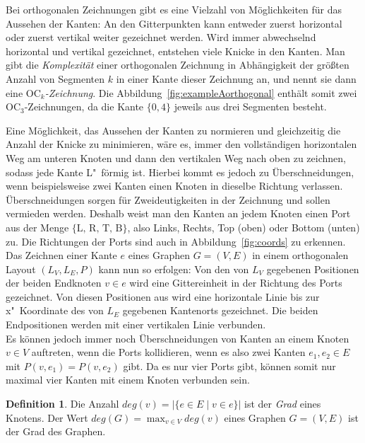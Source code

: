 \documentclass[a4paper]{scrreprt}
\theoremstyle{definition}
\newtheorem{definition}[satz]{Definition}
\begin{document}
Bei orthogonalen Zeichnungen gibt es eine Vielzahl von Möglichkeiten für das Aussehen der Kanten: An den Gitterpunkten kann entweder zuerst horizontal oder zuerst vertikal weiter gezeichnet werden. Wird immer abwechselnd horizontal und vertikal gezeichnet, entstehen viele Knicke in den Kanten. Man gibt die \emph{Komplexität} einer orthogonalen Zeichnung in Abhängigkeit der größten Anzahl von Segmenten $k$ in einer Kante dieser Zeichnung an, und nennt sie dann eine \emph{$\text{OC}_k$-Zeichnung}. Die Abbildung~\ref{fig:exampleAorthogonal} enthält somit zwei OC$_3$-Zeichnungen, da die Kante $\{0,4\}$ jeweils aus drei Segmenten besteht.

Eine Möglichkeit, das Aussehen der Kanten zu normieren und gleichzeitig die Anzahl der Knicke zu minimieren, wäre es, immer den vollständigen horizontalen Weg am unteren Knoten und dann den vertikalen Weg nach oben zu zeichnen, sodass jede Kante L"~förmig ist. Hierbei kommt es jedoch zu Überschneidungen, wenn beispielsweise zwei Kanten einen Knoten in dieselbe Richtung verlassen. Überschneidungen sorgen für Zweideutigkeiten in der Zeichnung und sollen vermieden werden. Deshalb weist man den Kanten an jedem Knoten einen Port aus der Menge $\{\text{L, R, T, B}\}$, also Links, Rechts, Top (oben) oder Bottom (unten) zu. Die Richtungen der Ports sind auch in Abbildung~\ref{fig:coords} zu erkennen.
\\

Das Zeichnen einer Kante $e$ eines Graphen $G = (V,E)$ in einem orthogonalen Layout $(L_V,L_E,P)$ kann nun so erfolgen: Von den von $L_V$ gegebenen Positionen der beiden Endknoten $v \in e$ wird eine Gittereinheit in der Richtung des Ports gezeichnet. Von diesen Positionen aus wird eine horizontale Linie bis zur x"~Koordinate des von $L_E$ gegebenen Kantenorts gezeichnet. Die beiden Endpositionen werden mit einer vertikalen Linie verbunden. %
\\

Es können jedoch immer noch Überschneidungen von Kanten an einem Knoten $v \in V$ auftreten, wenn die Ports kollidieren, wenn es also zwei Kanten $e_1, e_2 \in E$ mit $P(v, e_1) = P(v, e_2)$ gibt. Da es nur vier Ports gibt, können somit nur maximal vier Kanten mit einem Knoten verbunden sein.

\begin{definition}
  Die Anzahl $deg(v) = |\{e \in E \mid v \in e\}|$ ist der \emph{Grad} eines Knotens. Der Wert $deg(G) = \max_{v \in V}{deg(v)}$ eines Graphen $G = (V, E)$ ist der Grad des Graphen.
\end{definition}
\end{document}
